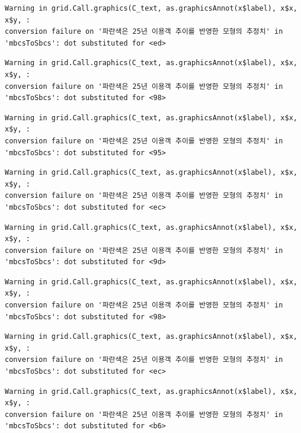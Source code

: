 \documentclass[
  letterpaper,
  DIV=11,
  numbers=noendperiod]{scrreprt}
\begin{document}
\begin{verbatim}
Warning in grid.Call.graphics(C_text, as.graphicsAnnot(x$label), x$x, x$y, :
conversion failure on '파란색은 25년 이용객 추이를 반영한 모형의 추정치' in
'mbcsToSbcs': dot substituted for <ed>
\end{verbatim}

\begin{verbatim}
Warning in grid.Call.graphics(C_text, as.graphicsAnnot(x$label), x$x, x$y, :
conversion failure on '파란색은 25년 이용객 추이를 반영한 모형의 추정치' in
'mbcsToSbcs': dot substituted for <98>
\end{verbatim}

\begin{verbatim}
Warning in grid.Call.graphics(C_text, as.graphicsAnnot(x$label), x$x, x$y, :
conversion failure on '파란색은 25년 이용객 추이를 반영한 모형의 추정치' in
'mbcsToSbcs': dot substituted for <95>
\end{verbatim}

\begin{verbatim}
Warning in grid.Call.graphics(C_text, as.graphicsAnnot(x$label), x$x, x$y, :
conversion failure on '파란색은 25년 이용객 추이를 반영한 모형의 추정치' in
'mbcsToSbcs': dot substituted for <ec>
\end{verbatim}

\begin{verbatim}
Warning in grid.Call.graphics(C_text, as.graphicsAnnot(x$label), x$x, x$y, :
conversion failure on '파란색은 25년 이용객 추이를 반영한 모형의 추정치' in
'mbcsToSbcs': dot substituted for <9d>
\end{verbatim}

\begin{verbatim}
Warning in grid.Call.graphics(C_text, as.graphicsAnnot(x$label), x$x, x$y, :
conversion failure on '파란색은 25년 이용객 추이를 반영한 모형의 추정치' in
'mbcsToSbcs': dot substituted for <98>
\end{verbatim}

\begin{verbatim}
Warning in grid.Call.graphics(C_text, as.graphicsAnnot(x$label), x$x, x$y, :
conversion failure on '파란색은 25년 이용객 추이를 반영한 모형의 추정치' in
'mbcsToSbcs': dot substituted for <ec>
\end{verbatim}

\begin{verbatim}
Warning in grid.Call.graphics(C_text, as.graphicsAnnot(x$label), x$x, x$y, :
conversion failure on '파란색은 25년 이용객 추이를 반영한 모형의 추정치' in
'mbcsToSbcs': dot substituted for <b6>
\end{verbatim}
\end{document}
